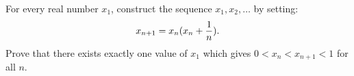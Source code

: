 For every real number $x_1$,  construct the sequence $x_1,x_2,\ldots$ by setting: \[ x_{n+1}=x_n(x_n+{1\over n}). \] Prove that there exists exactly one value of $x_1$ which gives $0<x_n<x_{n+1}<1$ for all $n$.